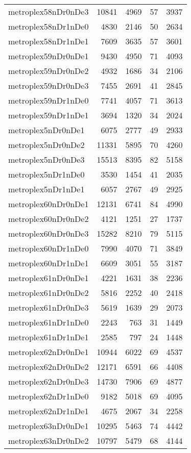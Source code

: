 \begin{longtable}{lrrrr}
metroplex58nDr0nDe3 & 10841 & 4969 & 57 & 3937 \\
metroplex58nDr1nDe0 & 4830 & 2146 & 50 & 2634 \\
metroplex58nDr1nDe1 & 7609 & 3635 & 57 & 3601 \\
metroplex59nDr0nDe1 & 9430 & 4950 & 71 & 4093 \\
metroplex59nDr0nDe2 & 4932 & 1686 & 34 & 2106 \\
metroplex59nDr0nDe3 & 7455 & 2691 & 41 & 2845 \\
metroplex59nDr1nDe0 & 7741 & 4057 & 71 & 3613 \\
metroplex59nDr1nDe1 & 3694 & 1320 & 34 & 2024 \\
metroplex5nDr0nDe1 & 6075 & 2777 & 49 & 2933 \\
metroplex5nDr0nDe2 & 11331 & 5895 & 70 & 4260 \\
metroplex5nDr0nDe3 & 15513 & 8395 & 82 & 5158 \\
metroplex5nDr1nDe0 & 3530 & 1454 & 41 & 2035 \\
metroplex5nDr1nDe1 & 6057 & 2767 & 49 & 2925 \\
metroplex60nDr0nDe1 & 12131 & 6741 & 84 & 4990 \\
metroplex60nDr0nDe2 & 4121 & 1251 & 27 & 1737 \\
metroplex60nDr0nDe3 & 15282 & 8210 & 79 & 5115 \\
metroplex60nDr1nDe0 & 7990 & 4070 & 71 & 3849 \\
metroplex60nDr1nDe1 & 6609 & 3051 & 55 & 3187 \\
metroplex61nDr0nDe1 & 4221 & 1631 & 38 & 2236 \\
metroplex61nDr0nDe2 & 5816 & 2252 & 40 & 2418 \\
metroplex61nDr0nDe3 & 5619 & 1639 & 29 & 2073 \\
metroplex61nDr1nDe0 & 2243 & 763 & 31 & 1449 \\
metroplex61nDr1nDe1 & 2585 & 797 & 24 & 1448 \\
metroplex62nDr0nDe1 & 10944 & 6022 & 69 & 4537 \\
metroplex62nDr0nDe2 & 12171 & 6591 & 66 & 4408 \\
metroplex62nDr0nDe3 & 14730 & 7906 & 69 & 4877 \\
metroplex62nDr1nDe0 & 9182 & 5018 & 69 & 4095 \\
metroplex62nDr1nDe1 & 4675 & 2067 & 34 & 2258 \\
metroplex63nDr0nDe1 & 10295 & 5463 & 74 & 4442 \\
metroplex63nDr0nDe2 & 10797 & 5479 & 68 & 4144 \\

\end{longtable}
